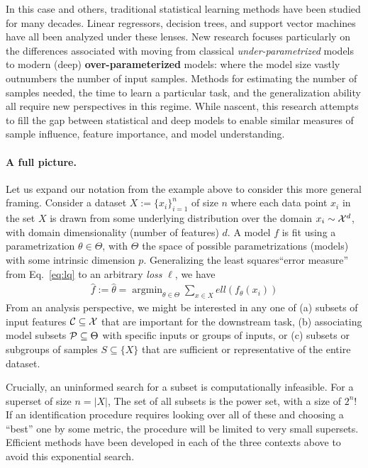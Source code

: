 In this case and others, traditional statistical learning methods 
have been studied 
for many decades.
Linear regressors, decision trees, and support vector machines
have all been analyzed under these lenses.
New research focuses
particularly on the differences
associated with moving from classical \textit{under-parametrized} models to
modern (deep) \textbf{over-parameterized} models: where
the model size vastly outnumbers the number
of input samples.
Methods for estimating the number of samples needed,
the time to learn a particular task,
and the generalization ability 
all require new perspectives in this regime.
While nascent, this research
attempts to fill the gap between
statistical and deep models to enable similar measures of sample influence, feature importance, and model understanding. 

\paragraph{A full picture.}
Let us expand our notation from the example above to consider this more general framing.
Consider a dataset $X:=\{x_i\}_{i=1}^n$ of size $n$ where each data point $x_i$ in the set $X$ is drawn from some underlying distribution over the domain $x_i \sim \mathcal{X}^d$, 
with domain dimensionality (number of features) $d$.
A model $f$ is fit using a parametrization $\theta \in \Theta$,
with $\Theta$ the space of possible parametrizations (models) with some intrinsic dimension $p$. 
Generalizing the least squares``error measure'' from Eq.~\ref{eq:lq} to an arbitrary \textit{loss} $\ell$, we have
\begin{align}\label{eq:learning}
    \hat{f}:=\hat{\theta} = \mathop{\arg\min}_{\theta\in\Theta} \sum_{x \in X} ell(f_\theta(x_i))
\end{align}
From an analysis perspective, 
we might be interested in any one of 
(a) subsets of input features $\mathcal{C} \subseteq \mathcal{X}$ that are important for the downstream task,
(b) associating model subsets $\mathcal{P} \subseteq \Theta$ with specific inputs or groups of inputs, or 
(c) subsets or subgroups of samples $S \subseteq \{X\}$ that are sufficient or representative of the entire dataset.

Crucially, an uninformed search for a subset is computationally infeasible. For a superset of size $n=|X|$, The set of all subsets is the power set, with a size of $2^{n}$! If an identification procedure requires looking over all of these and choosing a ``best'' one by some metric, the procedure will be limited to very small supersets.
Efficient methods have been developed in each of the three contexts above to avoid this exponential search.

